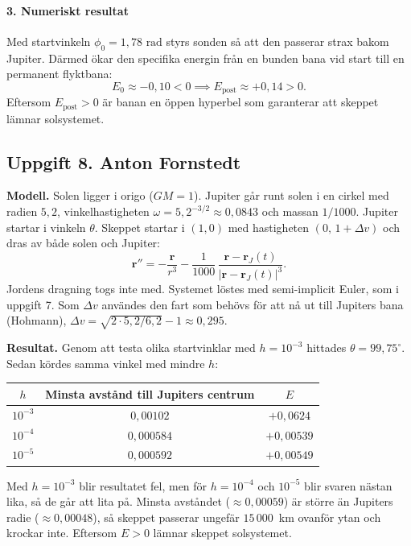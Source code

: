 \documentclass{article}
\begin{document}
\paragraph{3. Numeriskt resultat}
Med startvinkeln $\phi_0 = 1{,}78\text{ rad}$ styrs sonden så att den passerar strax bakom Jupiter. Därmed ökar den specifika energin från en bunden bana vid start till en permanent flyktbana:
\begin{equation}
    E_0 \approx -0{,}10 < 0 \implies E_{\text{post}} \approx +0{,}14 > 0.
\end{equation}
Eftersom $E_{\text{post}} > 0$ är banan en öppen hyperbel som garanterar att skeppet lämnar solsystemet.

\subsection*{Uppgift 8. Anton Fornstedt}

\textbf{Modell.} Solen ligger i origo ($GM = 1$). Jupiter går runt solen i en
cirkel med radien $5{,}2$, vinkelhastigheten $\omega = 5{,}2^{-3/2} \approx 0{,}0843$
och massan $1/1000$. Jupiter startar i vinkeln $\theta$. Skeppet startar i
$(1, 0)$ med hastigheten $(0,\, 1 + \Delta v)$ och dras av både solen och Jupiter:
\[
  \mathbf{r}'' = -\frac{\mathbf{r}}{r^3}
  - \frac{1}{1000}\,\frac{\mathbf{r} - \mathbf{r}_J(t)}{|\mathbf{r} - \mathbf{r}_J(t)|^3}.
\]
Jordens dragning togs inte med. Systemet löstes med semi-implicit Euler, som
i uppgift 7. Som $\Delta v$ användes den fart som behövs för att nå ut till
Jupiters bana (Hohmann), $\Delta v = \sqrt{2 \cdot 5{,}2/6{,}2} - 1 \approx 0{,}295$.

\medskip
\textbf{Resultat.} Genom att testa olika startvinklar med $h = 10^{-3}$ hittades
$\theta = 99{,}75^\circ$. Sedan kördes samma vinkel med mindre $h$:

\begin{center}
\begin{tabular}{c c c}
\hline
$h$ & Minsta avstånd till Jupiters centrum & $E$ \\
\hline
$10^{-3}$ & $0{,}00102$  & $+0{,}0624$ \\
$10^{-4}$ & $0{,}000584$ & $+0{,}00539$ \\
$10^{-5}$ & $0{,}000592$ & $+0{,}00549$ \\
\hline
\end{tabular}
\end{center}

Med $h = 10^{-3}$ blir resultatet fel, men för $h = 10^{-4}$ och $10^{-5}$ blir
svaren nästan lika, så de går att lita på. Minsta avståndet ($\approx 0{,}00059$)
är större än Jupiters radie ($\approx 0{,}00048$), så skeppet passerar ungefär
$15\,000$~km ovanför ytan och krockar inte. Eftersom $E > 0$ lämnar skeppet
solsystemet.
\end{document}
